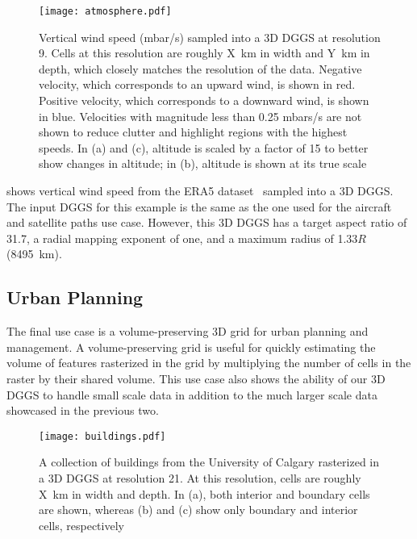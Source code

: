 \begin{figure}[ht!]
	\centering
	\texttt{[image: atmosphere.pdf]}
	\caption[Atmospheric properties resampling use case showing vertical wind speed]{
		Vertical wind speed (mbar/s) sampled into a 3D DGGS at resolution 9.
		Cells at this resolution are roughly X~km in width and Y~km in depth, which closely matches the resolution of the data.
		Negative velocity, which corresponds to an upward wind, is shown in red.
		Positive velocity, which corresponds to a downward wind, is shown in blue.
		Velocities with magnitude less than 0.25 mbars/s are not shown to reduce clutter and highlight regions with the highest speeds.
		In (a) and (c), altitude is scaled by a factor of 15 to better show changes in altitude; in (b), altitude is shown at its true scale
	}
	\label{fig:atmosphere}
\end{figure}


 shows vertical wind speed from the ERA5 dataset~\cite{era5} sampled into a 3D DGGS.
The input DGGS for this example is the same as the one used for the aircraft and satellite paths use case.
However, this 3D DGGS has a target aspect ratio of 31.7, a radial mapping exponent of one, and a maximum radius of 1.33$R$ (8495~km).


\subsection{Urban Planning} \label{chap:8:buildings}
The final use case is a volume-preserving 3D grid for urban planning and management.
A volume-preserving grid is useful for quickly estimating the volume of features rasterized in the grid by multiplying the number of cells in the raster by their shared volume.
This use case also shows the ability of our 3D DGGS to handle small scale data in addition to the much larger scale data showcased in the previous two.


\begin{figure}[ht!]
	\centering
	\texttt{[image: buildings.pdf]}
	\caption[Urban planning use case showing various rasterized buildings]{
		A collection of buildings from the University of Calgary rasterized in a 3D DGGS at resolution 21.
		At this resolution, cells are roughly X~km in width and depth.
		In (a), both interior and boundary cells are shown, whereas (b) and (c) show only boundary and interior cells, respectively
	}
	\label{fig:urbanplanning}
\end{figure}


